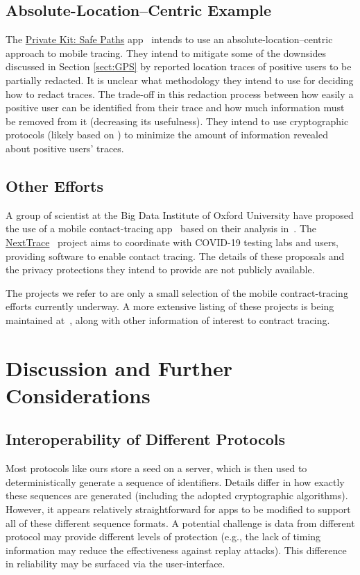 \documentclass{article}
\begin{document}
\subsection{Absolute-Location--Centric Example}
The \href{http://safepaths.mit.edu/}{Private Kit: Safe Paths} app~\cite{safepaths,safepaths2} intends to use an absolute-location--centric approach to mobile tracing.
They intend to mitigate some of the downsides discussed in Section \ref{sect:GPS} by reported location traces of positive users to be partially redacted.
It is unclear what methodology they intend to use for deciding how to redact traces. The trade-off in this redaction process between how easily a positive user can be identified from their trace and how much information must be removed from it (decreasing its usefulness). 
They intend to use cryptographic protocols (likely based on \cite{safepathsmaybe}) to minimize the amount of information revealed about positive users' traces.

\subsection{Other Efforts}
A group of scientist at the Big Data Institute of Oxford University have proposed the use of a mobile contact-tracing app~\cite{oxford,oxford2} based on their analysis in~\cite{oxford3}.
The \href{https://nexttrace.org/}{NextTrace}~\cite{nexttrace} project aims to coordinate with COVID-19 testing labs and users, providing software to enable contact tracing.
The details of these proposals and the privacy protections they intend to provide are not publicly available.

The projects we refer to are only a small selection of the mobile contract-tracing efforts currently underway.
A more extensive listing of these projects is being maintained at~\cite{gdoc}, along with other information of interest to contract tracing.

\section{Discussion and Further Considerations}


\subsection{Interoperability of Different Protocols}

Most protocols like ours store a seed on a server, which is then used to deterministically generate a sequence of identifiers. Details differ in how exactly these sequences are generated (including the adopted cryptographic algorithms).  However, it appears relatively straightforward for apps to be modified to support all of these different sequence formats. A potential challenge is data from different protocol may provide different levels of protection (e.g., the lack of timing information may reduce the effectiveness against replay attacks). This difference in reliability may be surfaced via the user-interface.
\end{document}
